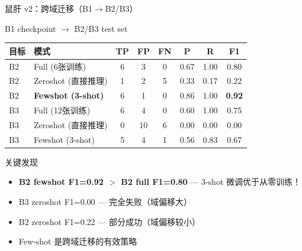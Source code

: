 \documentclass[aspectratio=169, 10pt]{beamer}
\begin{document}
\begin{frame}{鼠肝 v2：跨域迁移（B1$\to$B2/B3）}
  \begin{block}{B1 checkpoint $\to$ B2/B3 test set}
    \begin{tabular}{llcccccc}
      \toprule
      \textbf{目标} & \textbf{模式} & \textbf{TP} & \textbf{FP} & \textbf{FN} & \textbf{P} & \textbf{R} & \textbf{F1} \\
      \midrule
      B2 & Full (6张训练) & 6 & 3 & 0 & 0.67 & 1.00 & 0.80 \\
      B2 & Zeroshot (直接推理) & 1 & 2 & 5 & 0.33 & 0.17 & 0.22 \\
      B2 & \textbf{Fewshot (3-shot)} & 6 & 1 & 0 & 0.86 & 1.00 & \textbf{0.92} \\
      \midrule
      B3 & Full (12张训练) & 6 & 4 & 0 & 0.60 & 1.00 & 0.75 \\
      B3 & Zeroshot (直接推理) & 0 & 10 & 6 & 0.00 & 0.00 & 0.00 \\
      B3 & Fewshot (3-shot) & 5 & 4 & 1 & 0.56 & 0.83 & 0.67 \\
      \bottomrule
    \end{tabular}
  \end{block}
  \vspace{0em}
  \begin{alertblock}{关键发现}
    \begin{itemize}
      \item \textbf{B2 fewshot F1=0.92 $>$ B2 full F1=0.80} — 3-shot 微调优于从零训练！
      \item B3 zeroshot F1=0.00 — 完全失败（域偏移大）
      \item B2 zeroshot F1=0.22 — 部分成功（域偏移较小）
      \item Few-shot 是跨域迁移的有效策略
    \end{itemize}
  \end{alertblock}
\end{frame}
\end{document}
